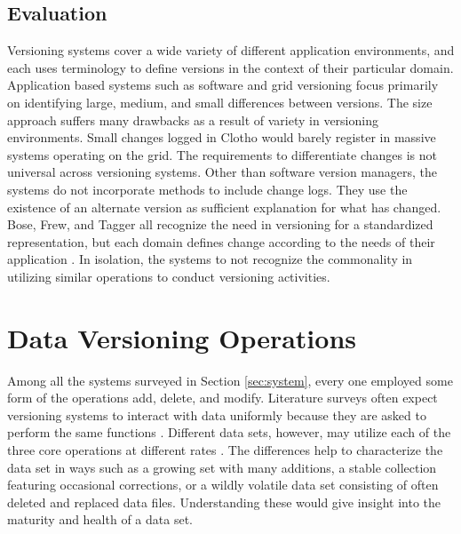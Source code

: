 \subsection{Evaluation}

Versioning systems cover a wide variety of different application environments, and each uses terminology to define versions in the context of their particular domain.
Application based systems such as software and grid versioning focus primarily on identifying large, medium, and small differences between versions.
The size approach suffers many drawbacks as a result of variety in versioning environments.
Small changes logged in Clotho would barely register in massive systems operating on the grid.
The requirements to differentiate changes is not universal across versioning systems.
Other than software version managers, the systems do not incorporate methods to include change logs.
They use the existence of an alternate version as sufficient explanation for what has changed.
Bose, Frew, and Tagger all recognize the need in versioning for a standardized representation, but each domain defines change according to the needs of their application \cite{Bose:2005:LRS:1057977.1057978} \cite{Tagger2005}.
In isolation, the systems to not recognize the commonality in utilizing similar operations to conduct versioning activities.

\section{Data Versioning Operations}

Among all the systems surveyed in Section \ref{sec:system}, every one employed some form of the operations add, delete, and modify.
Literature surveys often expect versioning systems to interact with data uniformly because they are asked to perform the same functions \cite{Tagger2005}.
Different data sets, however, may utilize each of the three core operations at different rates \cite{rohtua}.
The differences help to characterize the data set in ways such as a growing set with many additions, a stable collection featuring occasional corrections, or a wildly volatile data set consisting of often deleted and replaced data files.
Understanding these would give insight into the maturity and health of a data set.

